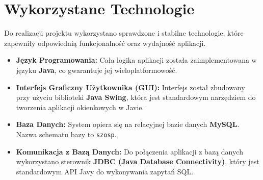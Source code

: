 \section{Wykorzystane Technologie}
\label{sec:technologie}

Do realizacji projektu wykorzystano sprawdzone i stabilne technologie, które zapewniły odpowiednią funkcjonalność oraz wydajność aplikacji.
\begin{itemize}
    \item \textbf{Język Programowania:} Cała logika aplikacji została zaimplementowana w języku \textbf{Java}, co gwarantuje jej wieloplatformowość.
    \item \textbf{Interfejs Graficzny Użytkownika (GUI):} Interfejs został zbudowany przy użyciu biblioteki \textbf{Java Swing}, która jest standardowym narzędziem do tworzenia aplikacji okienkowych w Javie.
    \item \textbf{Baza Danych:} System opiera się na relacyjnej bazie danych \textbf{MySQL}. Nazwa schematu bazy to \texttt{szosp}.
    \item \textbf{Komunikacja z Bazą Danych:} Do połączenia aplikacji z bazą danych wykorzystano sterownik \textbf{JDBC (Java Database Connectivity)}, który jest standardowym API Javy do wykonywania zapytań SQL.
\end{itemize}


